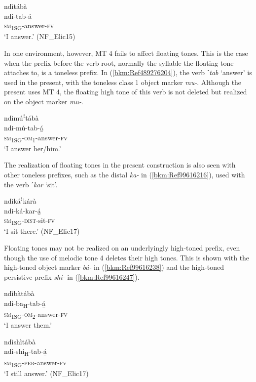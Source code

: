\ea
\label{bkm:Ref489354995}
\glll ndìtábà\\
ndi-tab-á̲\\
\textsc{sm}\textsubscript{1SG}-answer-\textsc{fv}\\
\glt ‘I answer.’ (NF\_Elic15)
\z

In one environment, however, MT 4 fails to affect floating tones. This is the case when the pre\-fix before the verb root, normally the syllable the floating tone attaches to, is a toneless prefix. In (\ref{bkm:Ref489276204}), the verb \textit{ˊtab} ‘answer’ is used in the present, with the toneless class 1 object marker \textit{mu-}. Although the present uses MT 4, the floating high tone of this verb is not deleted but realized on the object marker \textit{mu-}.

\ea
\label{bkm:Ref489276204}
\glll ndìmúꜝtábà\\
ndi-mú-tab-á̲\\
\textsc{sm}\textsubscript{1SG}-\textsc{om}\textsubscript{1}-answer-\textsc{fv}\\
\glt ‘I answer her/him.’
\z

The realization of floating tones in the present construction is also seen with other toneless pre\-fixes, such as the distal \textit{ka-} in (\ref{bkm:Ref99616216}), used with the verb \textit{ˊkar} ‘sit’.

\ea
\label{bkm:Ref99616216}
\glll ndìkáꜝkárà\\
ndi-ká-kar-á̲\\
\textsc{sm}\textsubscript{1SG}-\textsc{dist}-sit-\textsc{fv}\\
\glt ‘I sit there.’ (NF\_Elic17)
\z

Floating tones may not be realized on an underlyingly high-toned prefix, even though the use of melodic tone 4 deletes their high tones. This is shown with the high-toned ob\-ject marker \textit{bá-} in (\ref{bkm:Ref99616238}) and the high-toned persistive prefix \textit{shí-} in (\ref{bkm:Ref99616247}).

\ea
\label{bkm:Ref99616238}
\glll ndìbàtábà\\
ndi-ba\textsubscript{H}-tab-á̲\\
\textsc{sm}\textsubscript{1SG}-\textsc{om}\textsubscript{2}-answer-\textsc{fv}\\
\glt ‘I answer them.’
\z

\ea
\label{bkm:Ref99616247}
\glll ndìshìtábà\\
ndi-shi\textsubscript{H}-tab-á̲\\
\textsc{sm}\textsubscript{1SG}-\textsc{per}-answer-\textsc{fv}\\
\glt ‘I still answer.’ (NF\_Elic17)
\z

